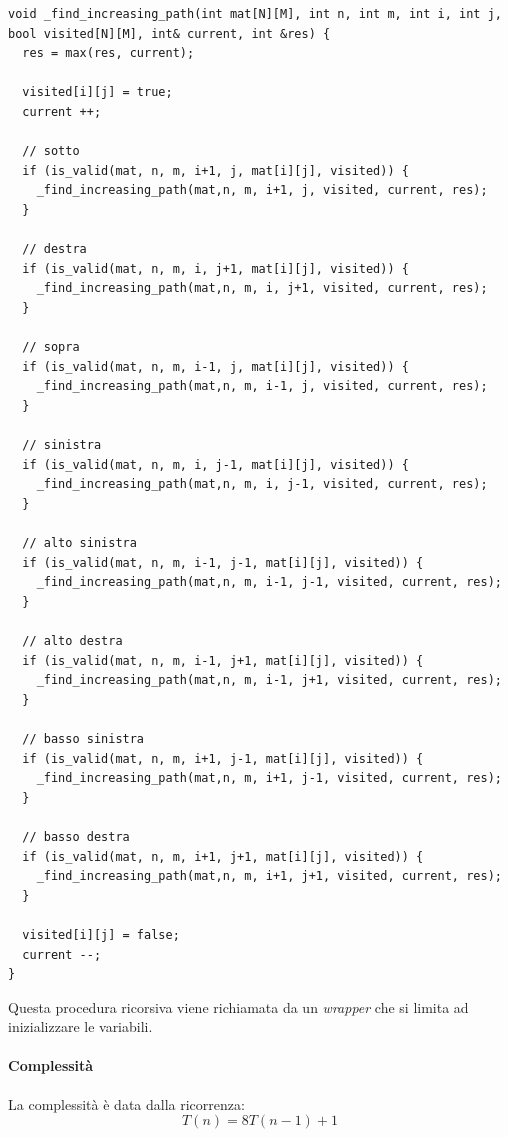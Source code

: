 \documentclass{article}
\begin{document}
\begin{lstlisting}[caption={Procedura di calcolo della lunghezza sequenza crescente},captionpos=b]
void _find_increasing_path(int mat[N][M], int n, int m, int i, int j, bool visited[N][M], int& current, int &res) {
  res = max(res, current);

  visited[i][j] = true;
  current ++;

  // sotto
  if (is_valid(mat, n, m, i+1, j, mat[i][j], visited)) {
    _find_increasing_path(mat,n, m, i+1, j, visited, current, res);
  }

  // destra
  if (is_valid(mat, n, m, i, j+1, mat[i][j], visited)) {
    _find_increasing_path(mat,n, m, i, j+1, visited, current, res);
  }

  // sopra
  if (is_valid(mat, n, m, i-1, j, mat[i][j], visited)) {
    _find_increasing_path(mat,n, m, i-1, j, visited, current, res);
  }

  // sinistra
  if (is_valid(mat, n, m, i, j-1, mat[i][j], visited)) {
    _find_increasing_path(mat,n, m, i, j-1, visited, current, res);
  }

  // alto sinistra
  if (is_valid(mat, n, m, i-1, j-1, mat[i][j], visited)) {
    _find_increasing_path(mat,n, m, i-1, j-1, visited, current, res);
  }

  // alto destra
  if (is_valid(mat, n, m, i-1, j+1, mat[i][j], visited)) {
    _find_increasing_path(mat,n, m, i-1, j+1, visited, current, res);
  }
  
  // basso sinistra
  if (is_valid(mat, n, m, i+1, j-1, mat[i][j], visited)) {
    _find_increasing_path(mat,n, m, i+1, j-1, visited, current, res);
  }
  
  // basso destra
  if (is_valid(mat, n, m, i+1, j+1, mat[i][j], visited)) {
    _find_increasing_path(mat,n, m, i+1, j+1, visited, current, res);
  }
  
  visited[i][j] = false;
  current --;
}

\end{lstlisting}
Questa procedura ricorsiva viene richiamata da un \textit{wrapper} che si limita ad inizializzare le variabili. 

\paragraph{Complessità}
La complessità è data dalla ricorrenza:
\begin{equation*}
    T(n) = 8T(n-1) + 1
\end{equation*}
\end{document}
